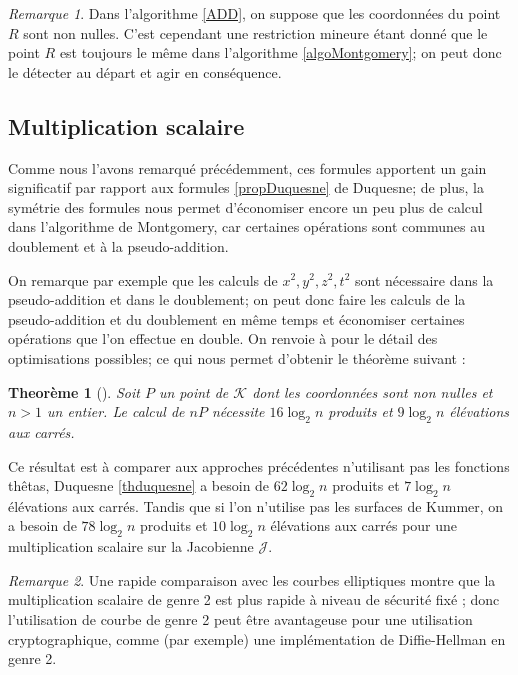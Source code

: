 \documentclass[a4paper,12pt]{article}
\newtheorem{theoreme}{Theorème}[section]
\theoremstyle{definition}
\theoremstyle{remark}
\newtheorem{remarque}{Remarque}
\numberwithin{equation}{section}
\begin{document}
\begin{remarque}
Dans l'algorithme \ref{ADD}, on suppose que les coordonnées du point $R$ sont non nulles. C'est cependant une restriction mineure étant donné que le point $R$ est toujours le même dans l'algorithme \ref{algoMontgomery}; on peut donc le détecter au départ et agir en conséquence.
\end{remarque}

\subsection{Multiplication scalaire}

Comme nous l'avons remarqué précédemment, ces formules apportent un gain significatif par rapport aux formules \ref{propDuquesne} de Duquesne; de plus, la symétrie des formules nous permet d'économiser encore un peu plus de calcul dans l'algorithme de Montgomery, car certaines opérations sont communes au doublement et à la pseudo-addition.

On remarque par exemple que les calculs de $x^2,y^2,z^2,t^2$ sont nécessaire dans la pseudo-addition et dans le doublement; on peut donc faire les calculs de la pseudo-addition et du doublement en même temps et économiser certaines opérations que l'on effectue en double. On renvoie à \citep{gaudry} pour le détail des optimisations possibles; ce qui nous permet d'obtenir le théorème suivant :
\begin{theoreme}[\citet{gaudry}]
\label{mulscal}
Soit $P$ un point de $\mathcal{K}$ dont les coordonnées sont non nulles et $n > 1$ un entier. Le calcul de $nP$ nécessite $16\log_2 n$ produits et $9\log_2 n$ élévations aux carrés.
\end{theoreme}

Ce résultat est à comparer aux approches précédentes n'utilisant pas les fonctions thêtas, Duquesne \ref{thduquesne} a besoin de $62\log_2 n$ produits et $7\log_2 n$ élévations aux carrés. Tandis que si l'on n'utilise pas les surfaces de Kummer, on a besoin de $78\log_2 n$ produits et $10\log_2 n$ élévations aux carrés pour une multiplication scalaire sur la Jacobienne $\mathcal{J}$.

\begin{remarque}
Une rapide comparaison avec les courbes elliptiques montre que la multiplication scalaire de genre 2 est plus rapide à niveau de sécurité fixé \citep[5.5]{gaudry}; donc l'utilisation de courbe de genre 2 peut être avantageuse pour une utilisation cryptographique, comme (par exemple) une implémentation de Diffie-Hellman en genre 2.
\end{remarque}
\end{document}
